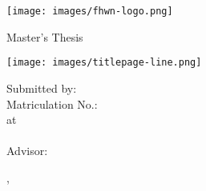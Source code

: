 
\makeatletter

\begin{titlepage}

  \texttt{[image: images/fhwn-logo.png]}

\begin{sffamily}
  \vspace{70pt}
  {\noindent \linespread{1.3} \color{header-blue} \Huge \textbf{\@title} \par }
  \vspace{5pt}
  {\noindent\Large Master's Thesis \par}
  \vspace{20pt}

  \hspace{-35mm}
  \texttt{[image: images/titlepage-line.png]}

  \vspace{15pt}

  \tabto{2cm}Submitted by: \tabto{7cm}\textbf{\@author} \\
  \tabto{2cm}Matriculation No.: \tabto{7cm}\textbf{\matriculationNumber} \\
  \vspace{15pt}
  \tabto{2cm}at \tabto{7cm}\textbf{\study}\\
  \tabto{7cm}\textbf{\studyprogram} \\
  \vspace{15pt}
  \tabto{2cm}Advisor: \tabto{7cm}\textbf{\advisor}

  \vfill

  \place, \thesisdate
\end{sffamily}
\end{titlepage}
\makeatother


